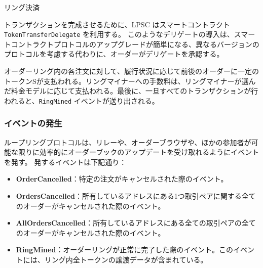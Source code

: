 \documentclass{article}
\makeatletter
\newenvironment{figurehere}
 {\def\@captype{figure}}
 {}
\makeatother
\begin{document}
\begin{multicols}{2}
\begin{center}
\begin{figurehere}
\caption{リング決済}
\label{fig:settlement}
\end{figurehere}
\end{center}

トランザクションを完成させるために、LPSC はスマートコントラクト \verb|TokenTransferDelegate| を利用する。 このようなデリゲートの導入は、スマートコントラクトプロトコルのアップグレードが簡単になる、異なるバージョンのプロトコルを考慮する代わりに、オーダーがデリゲートを承認する。

オーダーリング内の各注文に対して、履行状況に応じて前後のオーダーに一定のトークンSが支払われる。リングマイナーへの手数料は、リングマイナーが選んだ料金モデルに応じて支払われる。最後に、一旦すべてのトランザクションが行われると、\verb|RingMined| イベントが送り出される。


\subsubsection{イベントの発生\label{sec:events}}

ループリングプロトコルは、リレーや、オーダーブラウザや、ほかの参加者が可能な限りに効率的にオーダーブックのアップデートを受け取れるようにイベントを発す。 発するイベントは下記通り：

\begin{itemize}
	\item \textbf{OrderCancelled}：特定の注文がキャンセルされた際のイベント。
	\item \textbf{OrdersCancelled}：所有しているアドレスにある1つ取引ペアに関する全てのオーダーがキャンセルされた際のイベント。
	\item \textbf{AllOrdersCancelled}：所有しているアドレスにある全ての取引ペアの全てのオーダーがキャンセルされた際のイベント。
	\item \textbf{RingMined}：オーダーリングが正常に完了した際のイベント。このイベントには、リング内全トークンの譲渡データが含まれている。
\end{itemize}



\end{multicols}
\end{document}
